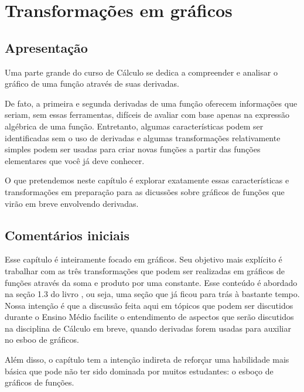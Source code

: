 \documentclass[main.tex]{subfiles}
\begin{document}
\paraAmbos

\chapter{Transformações em gráficos}

\section{Apresentação}

Uma parte grande do curso de Cálculo se dedica a compreender e analisar o gráfico de uma função através de suas derivadas.

De fato, a primeira e segunda derivadas de uma função oferecem informações que seriam, sem essas ferramentas, difíceis de avaliar com base apenas na expressão algébrica de uma função. Entretanto, algumas características podem ser identificadas sem o uso de derivadas e algumas transformações relativamente simples podem ser usadas para criar novas funções a partir das funções elementares que você já deve conhecer.

O que pretendemos neste capítulo é explorar exatamente essas características e transformações em preparação para as dicussões sobre gráficos de funções que virão em breve envolvendo derivadas.

\paraTutores

\section{Comentários iniciais}

Esse capítulo é inteiramente focado em gráficos. Seu objetivo mais explícito é trabalhar com as três transformações que podem ser realizadas em gráficos de funções através da soma e produto por uma constante. Esse conteúdo é abordado na seção 1.3 do livro , ou seja, uma seção que já ficou para trás à bastante tempo. Nossa intenção é que a discussão feita aqui em tópicos que podem ser discutidos durante o Ensino Médio facilite o entendimento de aspectos que serão discutidos na disciplina de Cálculo em breve, quando derivadas forem usadas para auxiliar no esboo de gráficos.

Além disso, o capítulo tem a intenção indireta de reforçar uma habilidade mais básica que pode não ter sido dominada por muitos estudantes: o esboço de gráficos de funções.
\end{document}

